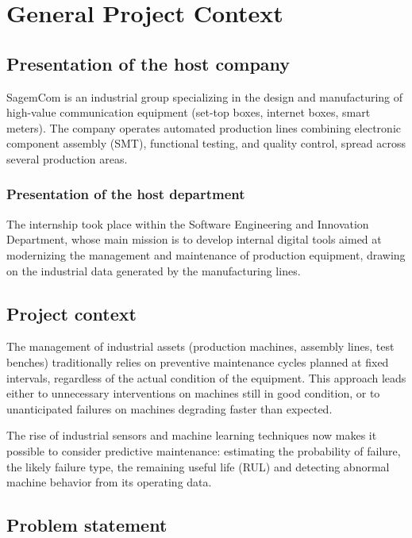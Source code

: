 \chapter{General Project Context}

\section{Presentation of the host company}

SagemCom is an industrial group specializing in the design and manufacturing of high-value communication equipment (set-top boxes, internet boxes, smart meters). The company operates automated production lines combining electronic component assembly (SMT), functional testing, and quality control, spread across several production areas.

\subsection{Presentation of the host department}

The internship took place within the Software Engineering and Innovation Department, whose main mission is to develop internal digital tools aimed at modernizing the management and maintenance of production equipment, drawing on the industrial data generated by the manufacturing lines.

\section{Project context}

The management of industrial assets (production machines, assembly lines, test benches) traditionally relies on preventive maintenance cycles planned at fixed intervals, regardless of the actual condition of the equipment. This approach leads either to unnecessary interventions on machines still in good condition, or to unanticipated failures on machines degrading faster than expected.

The rise of industrial sensors and machine learning techniques now makes it possible to consider predictive maintenance: estimating the probability of failure, the likely failure type, the remaining useful life (RUL) and detecting abnormal machine behavior from its operating data.

\section{Problem statement}
\label{sec:problematic}

